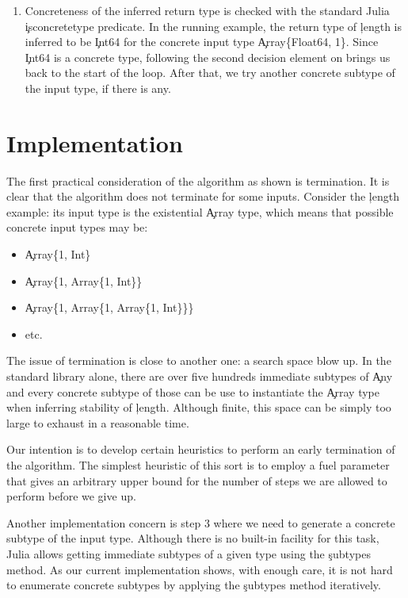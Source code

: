 \documentclass[sigplan,screen]{acmart}
\begin{document}
\begin{enumerate}
  \item Concreteness of the inferred return type is checked
  with the standard Julia \c{isconcretetype} predicate.
  In the running example,
  the return type of \c{length} is inferred to be \c{Int64}
  for the concrete input type \c{Array\{Float64, 1\}}.
  Since \c{Int64} is a concrete type,
  following the second decision element on brings us back to
  the start of the loop. After that, we try another concrete subtype of the input type,
  if there is any.
\end{enumerate}

\section{Implementation}%
\label{sec:impl}

The first practical consideration of the algorithm as shown is termination. It
is clear that the algorithm does not terminate for some inputs. Consider the
\c{length} example: its input type is the existential \c{Array} type, which
means that possible concrete input types may be:
\begin{itemize}

  \item \c{Array\{1, Int\}}
  \item \c{Array\{1, Array\{1, Int\}\}}
  \item \c{Array\{1, Array\{1, Array\{1, Int\}\}\}}
  \item etc.
\end{itemize}

The issue of termination is close to another one: a search space blow up.
In the standard library alone, there are over five hundreds immediate subtypes
of \c{Any} and every concrete subtype of those can be use to instantiate the
\c{Array} type when inferring stability of \c{length}. Although finite, this
space can be simply too large to exhaust in a reasonable time.

Our intention is to develop certain heuristics to perform an early termination
of the algorithm. The simplest heuristic of this sort is to employ a fuel
parameter that gives an arbitrary upper bound for the number of steps we are
allowed to perform before we give up.

Another implementation concern is step 3 where we need to generate a concrete
subtype of the input type. Although there is no built-in facility for this
task, Julia allows getting immediate subtypes of a given type using the
\c{subtypes} method. As our current implementation shows, with enough care, it
is not hard to enumerate concrete subtypes by applying the \c{subtypes} method
iteratively.
\end{document}

